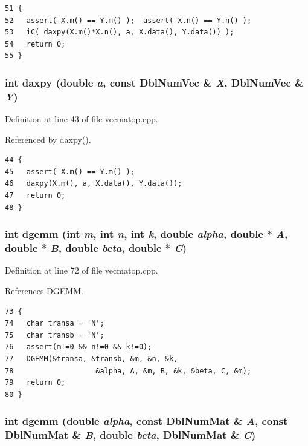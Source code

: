 \footnotesize\begin{verbatim}51 {
52   assert( X.m() == Y.m() );  assert( X.n() == Y.n() );
53   iC( daxpy(X.m()*X.n(), a, X.data(), Y.data()) );
54   return 0;
55 }
\end{verbatim}\normalsize 


\subsubsection{\setlength{\rightskip}{0pt plus 5cm}int daxpy (double {\em a}, const {\bf Dbl\-Num\-Vec} \& {\em X}, {\bf Dbl\-Num\-Vec} \& {\em Y})}\label{vecmatop_8cpp_217995e82dfd0f0d81770835a256a079_217995e82dfd0f0d81770835a256a079}




Definition at line 43 of file vecmatop.cpp.

Referenced by daxpy().

\footnotesize\begin{verbatim}44 {
45   assert( X.m() == Y.m() );
46   daxpy(X.m(), a, X.data(), Y.data());
47   return 0;
48 }
\end{verbatim}\normalsize 


\subsubsection{\setlength{\rightskip}{0pt plus 5cm}int dgemm (int {\em m}, int {\em n}, int {\em k}, double {\em alpha}, double $\ast$ {\em A}, double $\ast$ {\em B}, double {\em beta}, double $\ast$ {\em C})}\label{vecmatop_8cpp_ab0f3ccb6c8a9c6edf137f60264afe2c_ab0f3ccb6c8a9c6edf137f60264afe2c}




Definition at line 72 of file vecmatop.cpp.

References DGEMM.

\footnotesize\begin{verbatim}73 {
74   char transa = 'N';
75   char transb = 'N';
76   assert(m!=0 && n!=0 && k!=0);
77   DGEMM(&transa, &transb, &m, &n, &k,
78                   &alpha, A, &m, B, &k, &beta, C, &m);
79   return 0;
80 }
\end{verbatim}\normalsize 


\subsubsection{\setlength{\rightskip}{0pt plus 5cm}int dgemm (double {\em alpha}, const {\bf Dbl\-Num\-Mat} \& {\em A}, const {\bf Dbl\-Num\-Mat} \& {\em B}, double {\em beta}, {\bf Dbl\-Num\-Mat} \& {\em C})}\label{vecmatop_8cpp_7893f4c4a19f9a71147f10666feaa39e_7893f4c4a19f9a71147f10666feaa39e}




